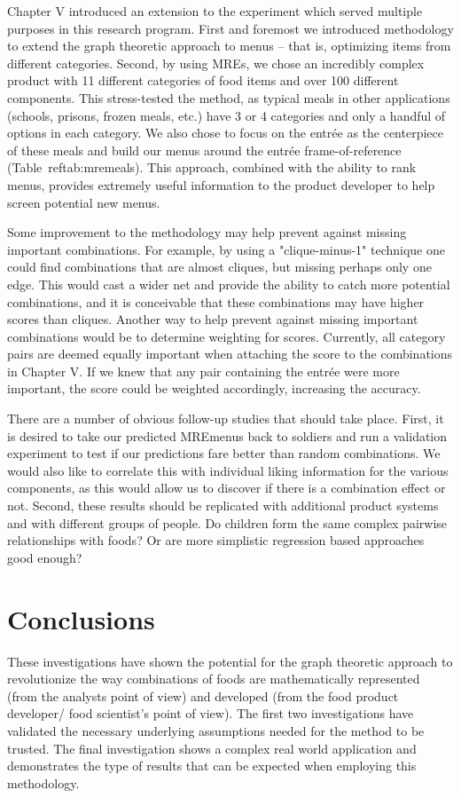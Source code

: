 Chapter V introduced an extension to the experiment which served multiple purposes in this research program.  First and foremost we introduced methodology to extend the graph theoretic approach to menus – that is, optimizing items from different categories.  Second, by using MREs\tm, we chose an incredibly complex product with 11 different categories of food items and over 100 different components.  This stress-tested the method, as typical meals in other applications (schools, prisons, frozen meals, etc.) have 3 or 4 categories and only a handful of options in each category.  We also chose to focus on the entrée as the centerpiece of these meals and build our menus around the entrée frame-of-reference (Table~ref{tab:mremeals}).  This approach, combined with the ability to rank menus, provides extremely useful information to the product developer to help screen potential new menus. 

Some improvement to the methodology may help prevent against missing important combinations.  For example, by using a "clique-minus-1" technique one could find combinations that are almost cliques, but missing perhaps only one edge.  This would cast a wider net and provide the ability to catch more potential combinations, and it is conceivable that these combinations may have higher scores than cliques.  Another way to help prevent against missing important combinations would be to determine weighting for scores.  Currently, all category pairs are deemed equally important when attaching the score to the combinations in Chapter V.  If we knew that any pair containing the entr\'{e}e were more important, the score could be weighted accordingly, increasing the accuracy.

There are a number of obvious follow-up studies that should take place.  First, it is desired to take our predicted MRE\tm menus back to soldiers and run a validation experiment to test if our predictions fare better than random combinations.  We would also like to correlate this with individual liking information for the various components, as this would allow us to discover if there is a combination effect or not.  Second, these results should be replicated with additional product systems and with different groups of people.  Do children form the same complex pairwise relationships with foods?  Or are more simplistic regression based approaches good enough?  

\section{Conclusions}
These investigations have shown the potential for the graph theoretic approach to revolutionize the way combinations of foods are mathematically represented (from the analysts point of view) and developed (from the food product developer/ food scientist’s point of view).  The first two investigations have validated the necessary underlying assumptions needed for the method to be trusted.  The final investigation shows a complex real world application and demonstrates the type of results that can be expected when employing this methodology. 
